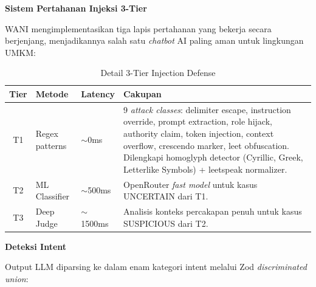 \documentclass[12pt,a4paper,oneside]{article}
\begin{document}
\textbf{Sistem Pertahanan Injeksi 3-Tier}

WANI mengimplementasikan tiga lapis pertahanan yang bekerja secara berjenjang, menjadikannya salah satu \textit{chatbot} AI paling aman untuk lingkungan UMKM:

\begin{table}[H]
	\centering
	\caption{Detail 3-Tier Injection Defense}
	\label{tab:tier}
	\begin{tabularx}{\textwidth}{cp{1.8cm}p{1.8cm}X}
		\toprule
		\textbf{Tier} & \textbf{Metode} & \textbf{Latency} & \textbf{Cakupan}                                                                                                                                                                                                                                                                       \\
		\midrule
		T1            & Regex patterns  & $\sim$0ms        & 9 \textit{attack classes}: delimiter escape, instruction override, prompt extraction, role hijack, authority claim, token injection, context overflow, crescendo marker, leet obfuscation. Dilengkapi homoglyph detector (Cyrillic, Greek, Letterlike Symbols) + leetspeak normalizer. \\
		\addlinespace
		T2            & ML Classifier   & $\sim$500ms      & OpenRouter \textit{fast model} untuk kasus UNCERTAIN dari T1.                                                                                                                                                                                                                          \\
		\addlinespace
		T3            & Deep Judge      & $\sim$1500ms     & Analisis konteks percakapan penuh untuk kasus SUSPICIOUS dari T2.                                                                                                                                                                                                                      \\
		\bottomrule
	\end{tabularx}
\end{table}

\textbf{Deteksi Intent}

Output LLM diparsing ke dalam enam kategori intent melalui Zod \textit{discriminated union}:
\end{document}
